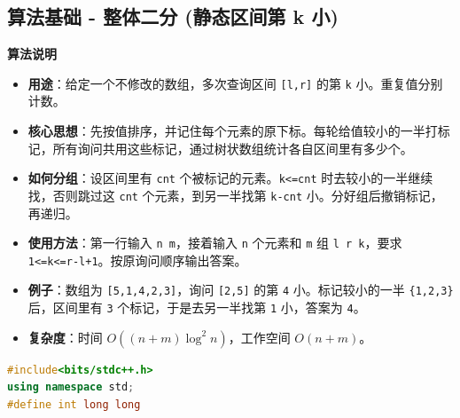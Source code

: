 \documentclass[10pt,landscape,a4paper]{article}
\begin{document}
\begin{multicols*}{3}
\subsection*{算法基础 - 整体二分 (静态区间第 k 小)}
\par\addvspace{0.7ex}\noindent\textbf{算法说明}\par\nobreak
\begin{itemize}
\item \textbf{用途}：给定一个不修改的数组，多次查询区间 \texttt{[\allowbreak{}l\allowbreak{},\allowbreak{}r\allowbreak{}]} 的第 \texttt{k} 小。重复值分别计数。
\item \textbf{核心思想}：先按值排序，并记住每个元素的原下标。每轮给值较小的一半打标记，所有询问共用这些标记，通过树状数组统计各自区间里有多少个。
\item \textbf{如何分组}：设区间里有 \texttt{c\allowbreak{}n\allowbreak{}t} 个被标记的元素。\texttt{k\allowbreak{}\textless{}\allowbreak{}=\allowbreak{}c\allowbreak{}n\allowbreak{}t} 时去较小的一半继续找，否则跳过这 \texttt{c\allowbreak{}n\allowbreak{}t} 个元素，到另一半找第 \texttt{k\allowbreak{}-\allowbreak{}c\allowbreak{}n\allowbreak{}t} 小。分好组后撤销标记，再递归。
\item \textbf{使用方法}：第一行输入 \texttt{n\allowbreak{} \allowbreak{}m}，接着输入 \texttt{n} 个元素和 \texttt{m} 组 \texttt{l\allowbreak{} \allowbreak{}r\allowbreak{} \allowbreak{}k}，要求 \texttt{1\allowbreak{}\textless{}\allowbreak{}=\allowbreak{}k\allowbreak{}\textless{}\allowbreak{}=\allowbreak{}r\allowbreak{}-\allowbreak{}l\allowbreak{}+\allowbreak{}1}。按原询问顺序输出答案。
\item \textbf{例子}：数组为 \texttt{[\allowbreak{}5\allowbreak{},\allowbreak{}1\allowbreak{},\allowbreak{}4\allowbreak{},\allowbreak{}2\allowbreak{},\allowbreak{}3\allowbreak{}]}，询问 \texttt{[\allowbreak{}2\allowbreak{},\allowbreak{}5\allowbreak{}]} 的第 \texttt{4} 小。标记较小的一半 \texttt{\{\allowbreak{}1\allowbreak{},\allowbreak{}2\allowbreak{},\allowbreak{}3\allowbreak{}\}} 后，区间里有 \texttt{3} 个标记，于是去另一半找第 \texttt{1} 小，答案为 \texttt{4}。
\item \textbf{复杂度}：时间 $O((n+m)\log^2 n)$，工作空间 $O(n+m)$。
\end{itemize}
\par{}\par
\begin{lstlisting}[language=C++]
#include<bits/stdc++.h>
using namespace std;
#define int long long


\end{lstlisting}
\end{multicols*}
\end{document}
